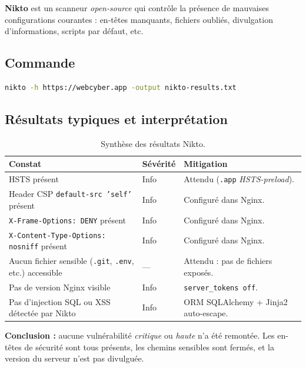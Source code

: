 \textbf{Nikto} est un scanneur \emph{open-source} qui contrôle la
présence de mauvaises configurations courantes : en-têtes manquants,
fichiers oubliés, divulgation d'informations, scripts par défaut, etc.

\subsection{Commande}

\begin{lstlisting}[language=bash, caption={Scan Nikto sur la cible HTTPS.}]
nikto -h https://webcyber.app -output nikto-results.txt
\end{lstlisting}

\subsection{Résultats typiques et interprétation}

\begin{table}[H]
\centering
\caption{Synthèse des résultats Nikto.}
\begin{tabular}{P{6cm} C{2cm} P{6cm}}
\toprule
\textbf{Constat} & \textbf{Sévérité} & \textbf{Mitigation} \\
\midrule
HSTS présent                                     & Info     & Attendu (\texttt{.app} \emph{HSTS-preload}). \\
Header CSP \texttt{default-src 'self'} présent   & Info     & Configuré dans Nginx. \\
\texttt{X-Frame-Options: DENY} présent           & Info     & Configuré dans Nginx. \\
\texttt{X-Content-Type-Options: nosniff} présent & Info     & Configuré dans Nginx. \\
Aucun fichier sensible (\texttt{.git}, \texttt{.env}, etc.) accessible & --- & Attendu : pas de fichiers exposés. \\
Pas de version Nginx visible                     & Info     & \texttt{server\_tokens off}. \\
Pas d'injection SQL ou XSS détectée par Nikto    & Info     & ORM SQLAlchemy + Jinja2 auto-escape. \\
\bottomrule
\end{tabular}
\end{table}

\textbf{Conclusion :} aucune vulnérabilité \emph{critique} ou
\emph{haute} n'a été remontée. Les en-têtes de sécurité sont tous
présents, les chemins sensibles sont fermés, et la version du serveur
n'est pas divulguée.

